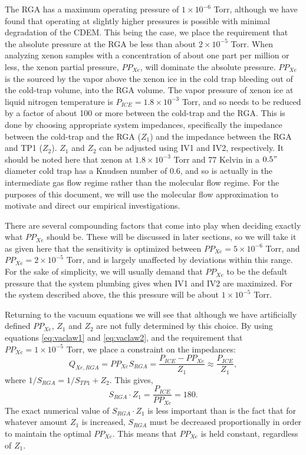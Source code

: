 \documentclass[12pt]{article}
\begin{document}
The RGA has a maximum operating pressure of $1\times 10^{-6}$ Torr, although we have found that operating at slightly higher pressures is possible with minimal degradation of the CDEM. This being the case, we place the requirement that the absolute pressure at the RGA be less than about $2\times 10^{-5}$ Torr. When analyzing xenon samples with a concentration of about one part per million or less, the xenon partial pressure, $PP_{Xe}$,  will dominate the absolute pressure. $PP_{Xe}$ is the sourced by the vapor above the xenon ice in the cold trap bleeding out of the cold-trap volume, into the RGA volume. The vapor pressure of xenon ice at liquid nitrogen temperature is $P_{ICE}=1.8\times 10^{-3}$ Torr, and so needs to be reduced by a factor of about 100 or more between the cold-trap and the RGA\cite{vaporpressure}. This is done by choosing appropriate system impedances, specifically the impedance between the cold-trap and the RGA ($Z_1$) and the impedance between the RGA and TP1 ($Z_2$). $Z_1$ and $Z_2$ can be adjusted using IV1 and IV2, respectively. It should be noted here that xenon at $1.8\times 10^{-3}$ Torr and 77 Kelvin in a $0.5"$ diameter cold trap has a Knudsen number of 0.6, and so is actually in the intermediate gas flow regime rather than the molecular flow regime\cite{vac_eq}. For the purposes of this document, we will use the molecular flow approximation to motivate and direct our empirical investigations.

There are several compounding factors that come into play when deciding exactly what $PP_{Xe}$ should be. These will be discussed in later sections, so we will take it as given here that the sensitivity is optimized between $PP_{Xe}=5\times10^{-6}$ Torr, and $PP_{Xe}=2\times10^{-5}$ Torr, and is largely unaffected by deviations within this range. For the sake of simplicity, we will usually demand that $PP_{Xe}$ to be the default pressure that the system plumbing gives when IV1 and IV2 are maximized. For the system described above, the this pressure will be about $1\times 10^{-5}$ Torr. 

Returning to the vacuum equations we will see that although we have artificially defined $PP_{Xe}$, $Z_1$ and $Z_2$ are not fully determined by this choice. By using equations \ref{eq:vaclaw1} and \ref{eq:vaclaw2}, and the requirement that $PP_{Xe}=1\times 10^{-5}$ Torr, we place a constraint on the impedances:
\begin{equation}
\label{eq:xepres1}
Q_{Xe,RGA}=PP_{Xe}S_{RGA}=\frac{P_{ICE}-PP_{Xe}}{Z_1}\approx \frac{P_{ICE}}{Z_1},
\end{equation}
where $1/S_{RGA}=1/S_{TP1}+Z_2$. This gives,
\begin{equation}
\label{eq:impconstraint}
S_{RGA}\cdot Z_1= \frac{P_{ICE}}{PP_{Xe}} = 180.
\end{equation}
The exact numerical value of $S_{RGA}\cdot Z_1$ is less important than is the fact that for whatever amount $Z_1$ is increased, $S_{RGA}$ must be decreased proportionally in order to maintain the optimal $PP_{Xe}$. This means that $PP_{Xe}$ is held constant, regardless of $Z_1$.
\end{document}
